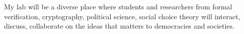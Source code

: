\documentclass[a4paper]{article}
\begin{document}
My lab will be a diverse place where students and researchers from formal 
verification, cryptography, 
political science, social choice theory will interact, discuss, 
collaborate on the ideas that matters to democracies and societies.


 

\end{document}
